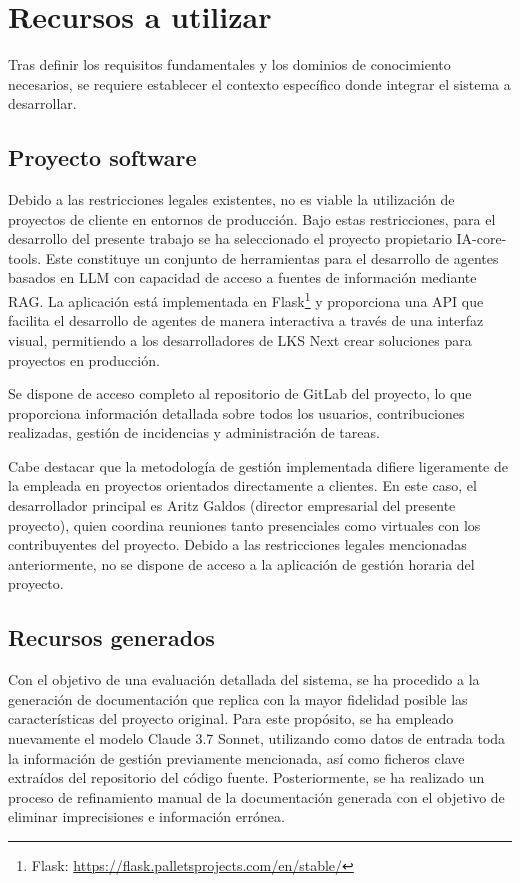 \section{Recursos a utilizar}
Tras definir los requisitos fundamentales y los dominios de conocimiento necesarios, se requiere establecer el contexto específico donde integrar el sistema a desarrollar. 
\subsection{Proyecto software}

Debido a las restricciones legales existentes, no es viable la utilización de proyectos de cliente en entornos de producción. Bajo estas restricciones, para el desarrollo del presente trabajo se ha seleccionado el proyecto propietario IA-core-tools. Este constituye un conjunto de herramientas para el desarrollo de agentes basados en LLM con capacidad de acceso a fuentes de información mediante RAG. La aplicación está implementada en Flask\footnote{Flask: \url{https://flask.palletsprojects.com/en/stable/}} y proporciona una API que facilita el desarrollo de agentes de manera interactiva a través de una interfaz visual, permitiendo a los desarrolladores de LKS Next crear soluciones para proyectos en producción.

Se dispone de acceso completo al repositorio de GitLab del proyecto, lo que proporciona información detallada sobre todos los usuarios, contribuciones realizadas, gestión de incidencias y administración de tareas.

Cabe destacar que la metodología de gestión implementada difiere ligeramente de la empleada en proyectos orientados directamente a clientes. En este caso, el desarrollador principal es Aritz Galdos (director empresarial del presente proyecto), quien coordina reuniones tanto presenciales como virtuales con los contribuyentes del proyecto. Debido a las restricciones legales mencionadas anteriormente, no se dispone de acceso a la aplicación de gestión horaria del proyecto.

\subsection{Recursos generados}
Con el objetivo de una evaluación detallada del sistema, se ha procedido a la generación de documentación que replica con la mayor fidelidad posible las características del proyecto original. Para este propósito, se ha empleado nuevamente el modelo Claude 3.7 Sonnet, utilizando como datos de entrada toda la información de gestión previamente mencionada, así como ficheros clave extraídos del repositorio del código fuente. Posteriormente, se ha realizado un proceso de refinamiento manual de la documentación generada con el objetivo de eliminar imprecisiones e información errónea.

